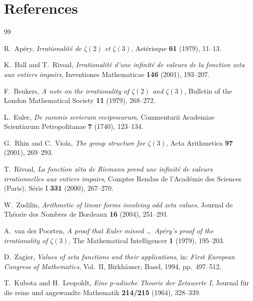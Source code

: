 \documentclass[12pt,a4paper]{amsart}
\theoremstyle{definition}
\theoremstyle{remark}
\begin{document}
\section{References}

\begin{thebibliography}{99}

R.~Apéry,
\textit{Irrationalité de $\zeta(2)$ et $\zeta(3)$},
Astérisque \textbf{61} (1979), 11--13.

K.~Ball and T.~Rivoal,
\textit{Irrationalité d'une infinité de valeurs de la fonction zeta aux entiers impairs},
Inventiones Mathematicae \textbf{146} (2001), 193--207.

F.~Beukers,
\textit{A note on the irrationality of $\zeta(2)$ and $\zeta(3)$},
Bulletin of the London Mathematical Society \textbf{11} (1979), 268--272.

L.~Euler,
\textit{De summis serierum reciprocarum},
Commentarii Academiae Scientiarum Petropolitanae \textbf{7} (1740), 123--134.

G.~Rhin and C.~Viola,
\textit{The group structure for $\zeta(3)$},
Acta Arithmetica \textbf{97} (2001), 269--293.

T.~Rivoal,
\textit{La fonction zêta de Riemann prend une infinité de valeurs irrationnelles
aux entiers impairs},
Comptes Rendus de l'Académie des Sciences (Paris), Série I \textbf{331} (2000),
267--270.

W.~Zudilin,
\textit{Arithmetic of linear forms involving odd zeta values},
Journal de Théorie des Nombres de Bordeaux \textbf{16} (2004), 251--291.

A.~van der Poorten,
\textit{A proof that Euler missed \ldots\ Apéry's proof of the irrationality of
$\zeta(3)$},
The Mathematical Intelligencer \textbf{1} (1979), 195--203.

D.~Zagier,
\textit{Values of zeta functions and their applications},
in: \textit{First European Congress of Mathematics}, Vol.~II,
Birkhäuser, Basel, 1994, pp.~497--512.

T.~Kubota and H.~Leopoldt,
\textit{Eine $p$-adische Theorie der Zetawerte I},
Journal für die reine und angewandte Mathematik \textbf{214/215} (1964), 328--339.

\end{thebibliography}
\end{document}
